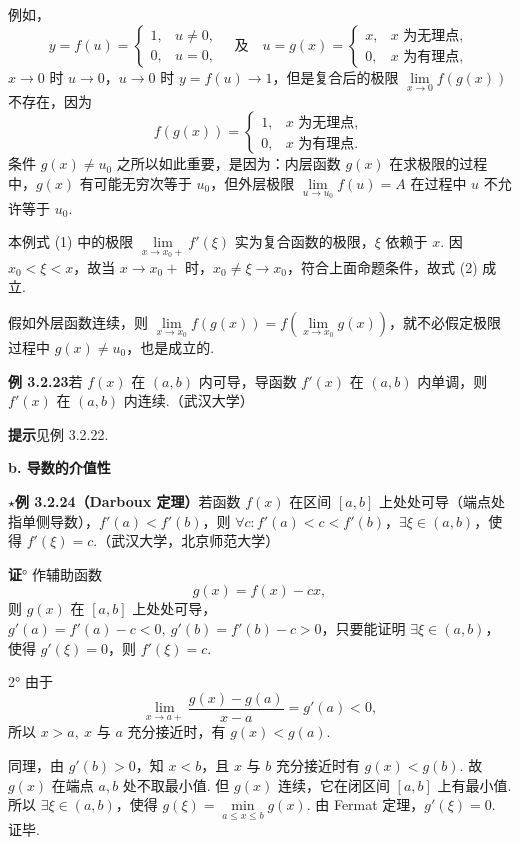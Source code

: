\documentclass[UTF8,12pt,a4paper,fontset=fandol]{ctexart}
\begin{document}
例如，
\[
y=f(u)=
\begin{cases}
1, & u\ne0,\\
0, & u=0,
\end{cases}
\quad\text{及}\quad
u=g(x)=
\begin{cases}
x, & x\text{ 为无理点},\\
0, & x\text{ 为有理点},
\end{cases}
\]
$x\to0$ 时 $u\to0$，$u\to0$ 时 $y=f(u)\to1$，但是复合后的极限 $\lim\limits_{x\to0}f(g(x))$ 不存在，因为
\[
f(g(x))=
\begin{cases}
1, & x\text{ 为无理点},\\
0, & x\text{ 为有理点}.
\end{cases}
\]
条件 $g(x)\ne u_0$ 之所以如此重要，是因为：内层函数 $g(x)$ 在求极限的过程中，$g(x)$ 有可能无穷次等于 $u_0$，但外层极限 $\lim\limits_{u\to u_0}f(u)=A$ 在过程中 $u$ 不允许等于 $u_0$.

本例式 (1) 中的极限 $\lim\limits_{x\to x_0+}f'(\xi)$ 实为复合函数的极限，$\xi$ 依赖于 $x$. 因 $x_0<\xi<x$，故当 $x\to x_0+$ 时，$x_0\ne\xi\to x_0$，符合上面命题条件，故式 (2) 成立.

假如外层函数连续，则 $\lim\limits_{x\to x_0}f(g(x))=f\left(\lim\limits_{x\to x_0}g(x)\right)$，就不必假定极限过程中 $g(x)\ne u_0$，也是成立的.

\noindent\textbf{例 3.2.23}\quad 若 $f(x)$ 在 $(a,b)$ 内可导，导函数 $f'(x)$ 在 $(a,b)$ 内单调，则 $f'(x)$ 在 $(a,b)$ 内连续.（武汉大学）

\noindent\textbf{提示}\quad 见例 3.2.22.

\noindent\textbf{b. 导数的介值性}

\noindent\textbf{$\star$例 3.2.24（Darboux 定理）}\quad 若函数 $f(x)$ 在区间 $[a,b]$ 上处处可导（端点处指单侧导数），$f'(a)<f'(b)$，则 $\forall c:f'(a)<c<f'(b)$，$\exists\xi\in(a,b)$，使得 $f'(\xi)=c$.（武汉大学，北京师范大学）

\noindent\textbf{证}° 作辅助函数
\[
  g(x)=f(x)-cx,
\]
则 $g(x)$ 在 $[a,b]$ 上处处可导，$g'(a)=f'(a)-c<0,\ g'(b)=f'(b)-c>0$，只要能证明 $\exists\xi\in(a,b)$，使得 $g'(\xi)=0$，则 $f'(\xi)=c$.

2° 由于
\[
  \lim_{x\to a+}\frac{g(x)-g(a)}{x-a}=g'(a)<0,
\]
所以 $x>a,\ x$ 与 $a$ 充分接近时，有 $g(x)<g(a)$.

同理，由 $g'(b)>0$，知 $x<b$，且 $x$ 与 $b$ 充分接近时有 $g(x)<g(b)$.
故 $g(x)$ 在端点 $a,b$ 处不取最小值. 但 $g(x)$ 连续，它在闭区间 $[a,b]$ 上有最小值. 所以 $\exists\xi\in(a,b)$，使得 $g(\xi)=\min\limits_{a\le x\le b}g(x)$. 由 Fermat 定理，$g'(\xi)=0$. 证毕.
\end{document}
